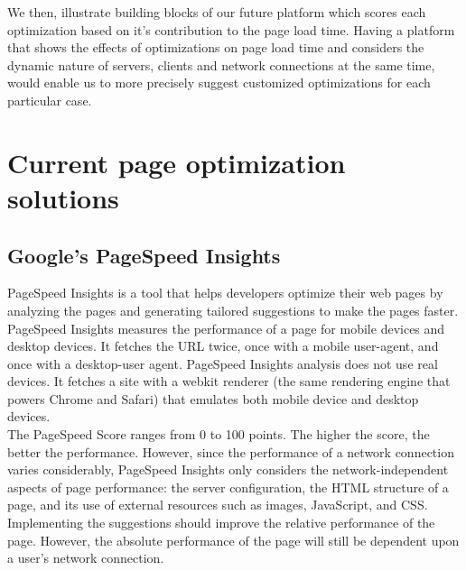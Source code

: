 \noindent We then, illustrate building blocks of our future platform which scores each optimization based on it's contribution to the page load time. Having a platform that shows the effects of optimizations on page load time and considers the dynamic nature of servers, clients and network connections at the same time, would enable us to more precisely suggest customized optimizations for each particular case.
\section{Current page optimization solutions}
\subsection{Google's PageSpeed Insights}
PageSpeed Insights \cite{pagespeedinsight} is a tool that helps developers optimize their web pages by analyzing the pages and generating tailored suggestions to make the pages faster.
PageSpeed Insights measures the performance of a page for mobile devices and desktop devices. It fetches the URL twice, once with a mobile user-agent, and once with a desktop-user agent. PageSpeed Insights analysis does not use real devices. It fetches a site with a webkit renderer (the same rendering engine that powers Chrome and Safari) that emulates both mobile device and desktop devices.\\

\noindent The PageSpeed Score ranges from 0 to 100 points. The higher the score, the better the performance. However, since the performance of a network connection varies considerably, PageSpeed Insights only considers the network-independent aspects of page performance: the server configuration, the HTML structure of a page, and its use of external resources such as images, JavaScript, and CSS. Implementing the suggestions should improve the relative performance of the page. However, the absolute performance of the page will still be dependent upon a user's network connection.\\\\

